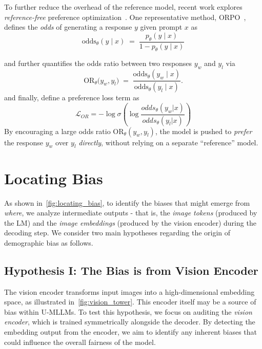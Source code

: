 To further reduce the overhead of the reference model, recent work explores \emph{reference-free} preference optimization~\cite{hong2024orpomonolithicpreferenceoptimization, meng2024simposimplepreferenceoptimization}. One representative method, ORPO~\cite{hong2024orpomonolithicpreferenceoptimization}, defines the \emph{odds} of generating a response $y$ given prompt $x$ as
\begin{equation}
    \text{odds}_\theta(y \mid x) 
    \;=\; 
    \frac{p_\theta(y \mid x)}{1 - p_\theta(y \mid x)}
\end{equation}

and further quantifies the odds ratio between two responses $y_{w}$ and $y_{l}$ via
\begin{equation}
    \text{OR}_\theta\bigl(y_{w}, y_{l}\bigr)
    \;=\;
    \frac{\text{odds}_\theta(y_{w} \mid x)}{\text{odds}_\theta(y_{l} \mid x)}.
\end{equation}
and finally, define a preference loss term as
\begin{equation}
    \mathcal{L}_{OR} = -\log \sigma \left( \log \frac{odds_\theta(y_w|x)}{odds_\theta(y_l|x)} \right) \label{eq:ratio} 
\end{equation}
By encouraging a large odds ratio $\text{OR}_\theta(y_{w}, y_{l})$, the model is pushed to \emph{prefer} the response $y_{w}$ over $y_{l}$ \emph{directly}, without relying on a separate  “reference” model. 
\vspace{-1em}
\section{Locating Bias}
As shown in~\autoref{fig:locating_bias}, to identify the biases that might emerge from \emph{where}, we analyze intermediate outputs - that is, the \emph{image tokens} (produced by the LM) and the \emph{image embeddings} (produced by the vision encoder) during the decoding step. We consider two main hypotheses regarding the origin of demographic bias as follows.
\vspace{-1em}
\subsection{Hypothesis I: The Bias is from Vision Encoder}
The vision encoder transforms input images into a high-dimensional embedding space, as illustrated in~\autoref{fig:vision_tower}. This encoder itself may be a source of bias within U-MLLMs. To test this hypothesis, we focus on auditing the \emph{vision encoder}, which is trained symmetrically alongside the decoder. By detecting the embedding output from the encoder, we aim to identify any inherent biases that could influence the overall fairness of the model.

